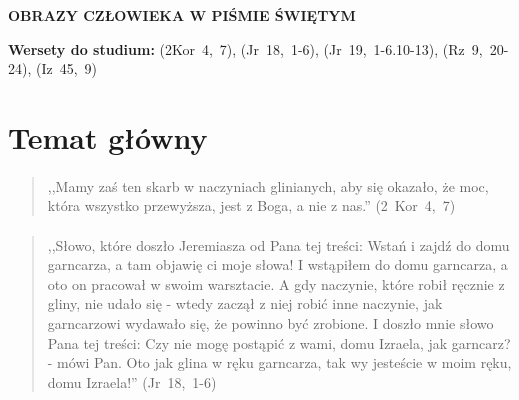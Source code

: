 \documentclass[10pt,a4paper,oneside]{article}
\begin{document}
\centerline{\textbf{\MakeUppercase{Obrazy człowieka w Piśmie Świętym}}}
\begin{center}
\textbf{Wersety do studium:} \mbox{(2Kor 4, 7)}, \mbox{(Jr 18, 1-6)}, \mbox{(Jr 19, 1-6.10-13)}, \mbox{(Rz 9, 20-24)}, \mbox{(Iz 45, 9)}
\end{center}
\section{Temat główny}
\paragraph{}
\begin{quote}
,,Mamy zaś ten skarb w naczyniach glinianych, aby się okazało, że moc, która wszystko przewyższa, jest z Boga, a nie z nas.'' \mbox{(2 Kor 4, 7)}
\end{quote}
\paragraph{}
\begin{quote}
,,Słowo, które doszło Jeremiasza od Pana tej treści: Wstań i zajdź do domu garncarza, a tam objawię ci moje słowa! I wstąpiłem do domu garncarza, a oto on pracował w swoim warsztacie. A gdy naczynie, które robił ręcznie z gliny, nie udało się - wtedy zaczął z niej robić inne naczynie, jak garncarzowi wydawało się, że powinno być zrobione. I doszło mnie słowo Pana tej treści: Czy nie mogę postąpić z wami, domu Izraela, jak garncarz? - mówi Pan. Oto jak glina w ręku garncarza, tak wy jesteście w moim ręku, domu Izraela!'' \mbox{(Jr 18, 1-6)}
\end{quote}
\end{document}
